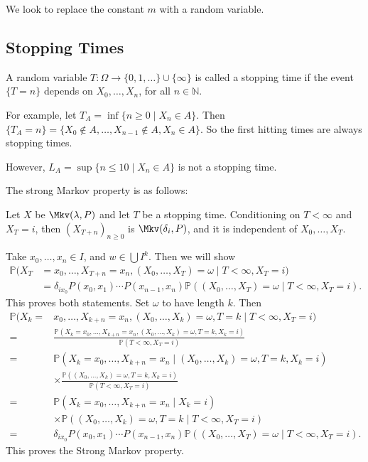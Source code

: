 \documentclass[12pt]{article}
\begin{document}
We look to replace the constant $m$ with a random variable.

\subsection{Stopping Times}%
\label{sub:stopping_times}

\begin{definition}
	A random variable $T : \Omega \to \{0, 1, \ldots\} \cup \{\infty\}$ is called a stopping time if the event $\{T = n\}$ depends on $X_0, \ldots, X_n$, for all $n \in \mathbb{N}$.
\end{definition}

For example, let $T_A = \inf\{n \geq 0 \mid X_n \in A\}$. Then $\{T_A = n\} = \{X_0 \not \in A, \ldots, X_{n-1} \not \in A, X_n \in A\}$. So the first hitting times are always stopping times.

However, $L_A = \sup\{n \leq 10 \mid X_n \in A\}$ is not a stopping time.

The strong Markov property is as follows:
\begin{proposition}
	Let $X$ be $\Mkv(\lambda, P)$ and let $T$ be a stopping time. Conditioning on $T < \infty$ and $X_T = i$, then $(X_{T + n})_{n \geq 0}$ is $\Mkv(\delta_i, P)$, and it is independent of $X_0, \ldots, X_T$.
\end{proposition}

\begin{proofbox}
	Take $x_0, \ldots, x_n \in I$, and $w \in \bigcup I^{k}$. Then we will show
\begin{align*}
	\mathbb{P}(X_T &= x_0, \ldots, X_{T+n} = x_n, (X_0, \ldots, X_T) = \omega \mid T < \infty, X_T = i) \\
		       &= \delta_{ix_0}P(x_0, x_1)\cdots P(x_{n-1}, x_n) \mathbb{P}((X_0, \ldots, X_T) = \omega \mid T< \infty, X_T = i).
\end{align*}
This proves both statements. Set $\omega$ to have length $k$. Then
\begin{align*}
	\mathbb{P}(X_k =& x_0, \ldots, X_{k+n} = x_n, (X_0, \ldots, X_k) = \omega, T = k \mid T < \infty, X_T = i) \\
	= & \frac{\mathbb{P}(X_k = x_0, \ldots, X_{k+n} = x_n, (X_0, \ldots, X_k) = \omega, T = k, X_k = i)}{\mathbb{P}(T < \infty, X_T = i)} \\
	= & \mathbb{P}(X_k = x_0, \ldots, X_{k+n} = x_n \mid (X_0, \ldots, X_k) = \omega, T = k, X_k = i)\\
	  & \times \frac{\mathbb{P}((X_0, \ldots, X_k) = \omega, T = k, X_k = i)}{\mathbb{P}(T < \infty, X_T = i)} \\
	= &\mathbb{P}(X_k = x_0, \ldots, X_{k+n} = x_n \mid X_k = i) \\
	  & \times \mathbb{P}((X_0, \ldots, X_k) = \omega, T = k \mid T < \infty, X_T = i) \\
	= & \delta_{ix_0}P(x_0, x_1) \cdots P(x_{n-1}, x_n) \mathbb{P}((X_0, \ldots, X_T) = \omega \mid T < \infty, X_T = i).
\end{align*}
This proves the Strong Markov property.
\end{proofbox}
\end{document}
